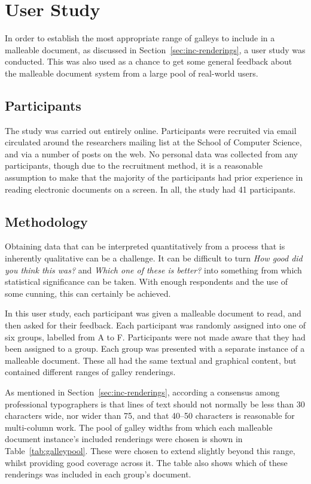 \newpage
\section{User Study}
\label{sec:survey}
In order to establish the most appropriate range of galleys to include in a malleable document, as discussed in Section~\ref{sec:inc-renderings}, a user study was conducted. This was also used as a chance to get some general feedback about the malleable document system from a large pool of real-world users.

\subsection{Participants}
The study was carried out entirely online. Participants were recruited via email circulated around the researchers mailing list at the School of Computer Science, and via a number of posts on the web. No personal data was collected from any participants, though due to the recruitment method, it is a reasonable assumption to make that the majority of the participants had prior experience in reading electronic documents on a screen. In all, the study had 41 participants.

\subsection{Methodology}
Obtaining data that can be interpreted quantitatively from a process that is inherently qualitative can be a challenge. It can be difficult to turn \emph{How good did you think this was?} and \emph{Which one of these is better?} into something from which statistical significance can be taken. With enough respondents and the use of some cunning, this can certainly be achieved.

In this user study, each participant was given a malleable document to read, and then asked for their feedback. Each participant was randomly assigned into one of six groups, labelled from A to F. Participants were not made aware that they had been assigned to a group. Each group was presented with a separate instance of a malleable document. These all had the same textual and graphical content, but contained different ranges of galley renderings.

As mentioned in Section~\ref{sec:inc-renderings}, according a consensus among professional typographers is that lines of text should not normally be less than 30 characters wide, nor wider than 75, and that 40--50 characters is reasonable for multi-column work. The pool of galley widths from which each malleable document instance's included renderings were chosen is shown in Table~\ref{tab:galleypool}. These were chosen to extend slightly beyond this range, whilst providing good coverage across it. The table also shows which of these renderings was included in each group's document.

